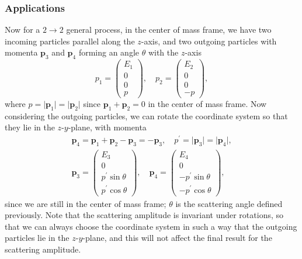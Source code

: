 \subsubsection{Applications}

Now for a \(2 \to  2\) general process, in the center of mass frame, we have two incoming particles parallel along the \(z\)-axis, and two outgoing particles with momenta \(\mathbf{p}_3\) and \(\mathbf{p}_4\) forming an angle \(\theta\) with the \(z\)-axis
\[
    p_1 = \begin{pmatrix}
        E_1 \\
        0   \\
        0   \\
        p
    \end{pmatrix}, \quad p_2 = \begin{pmatrix}
        E_2 \\
        0   \\
        0   \\
        -p
    \end{pmatrix},
\]
where \(p = \vert \mathbf{p}_1 \vert = \vert \mathbf{p}_2 \vert \) since \(\mathbf{p}_1 + \mathbf{p}_2 = 0\) in the center of mass frame. Now considering the outgoing particles, we can rotate the coordinate system so that they lie in the \(z\)-\(y\)-plane, with momenta
\[
    \begin{aligned}
        \mathbf{p}_4 = \mathbf{p}_1 + \mathbf{p}_2 - \mathbf{p}_3 = - \mathbf{p}_3, \quad p^{\prime} = \vert \mathbf{p}_3 \vert = \vert \mathbf{p}_4 \vert, \\
        \mathbf{p}_3 = \begin{pmatrix}
                           E_3                    \\
                           0                      \\
                           p^{\prime} \sin \theta \\
                           p^{\prime} \cos \theta
                       \end{pmatrix}, \quad \mathbf{p}_4 = \begin{pmatrix}
                                                               E_4                     \\
                                                               0                       \\
                                                               -p^{\prime} \sin \theta \\
                                                               -p^{\prime} \cos \theta
                                                           \end{pmatrix},
    \end{aligned}
\]
since we are still in the center of mass frame; \(\theta\) is the scattering angle defined previously. Note that the scattering amplitude is invariant under rotations, so that we can always choose the coordinate system in such a way that the outgoing particles lie in the \(z\)-\(y\)-plane, and this will not affect the final result for the scattering amplitude.

